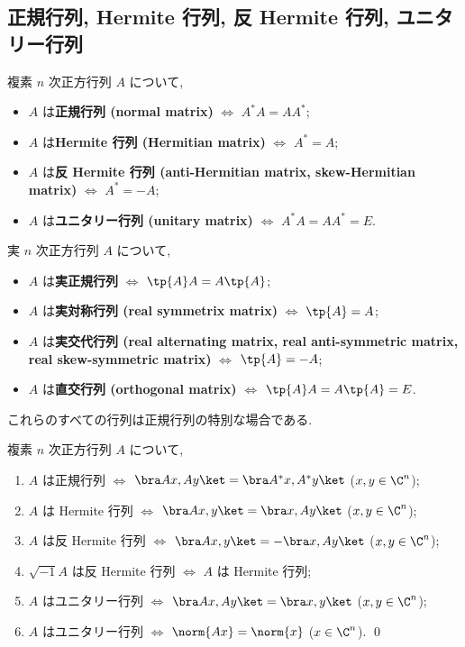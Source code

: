 \documentclass[12pt,twoside]{jarticle}
\begin{document}

\subsection{正規行列, Hermite 行列, 反 Hermite 行列, ユニタリー行列}


複素 $n$ 次正方行列 $A$ について, 
\begin{itemize}
\item $A$ は{\bf 正規行列 (normal matrix)} $\iff$ $A^*A=AA^*$;
\item $A$ は{\bf  Hermite 行列 (Hermitian matrix)} $\iff$ $A^*=A$;
\item $A$ は{\bf 反 Hermite 行列 (anti-Hermitian matrix, skew-Hermitian
    matrix)} $\iff$ $A^* = -A$;
\item $A$ は{\bf ユニタリー行列 (unitary matrix)} $\iff$ 
  $A^*A = AA^* = E$.
\end{itemize}
実 $n$ 次正方行列 $A$ について,
\begin{itemize}
\item $A$ は{\bf 実正規行列} $\iff$ $\tp{A}A=A\tp{A}$; 
\item $A$ は{\bf 実対称行列 (real symmetrix matrix)} $\iff$
  $\tp{A}=A$; 
\item $A$ は{\bf 実交代行列 (real alternating matrix, real anti-symmetric 
    matrix, real skew-symmetric matrix)} $\iff$ $\tp{A}=-A$;
\item $A$ は{\bf 直交行列 (orthogonal matrix)} $\iff$
  $\tp{A}A=A\tp{A}=E$. 
\end{itemize}
これらのすべての行列は正規行列の特別な場合である. 


\begin{question}[12点]
\label{q:normal-matrix-misc}
  複素 $n$ 次正方行列 $A$ について, 
  \begin{enumerate}
  \item $A$ は正規行列 $\iff$ 
    $\bra Ax,Ay\ket = \bra A^*x,A^*y\ket$ \quad ($x,y\in\C^n$);
  \item $A$ は Hermite 行列 $\iff$ 
    $\bra Ax,y\ket = \bra x,Ay\ket$ \quad ($x,y\in\C^n$);
  \item $A$ は反 Hermite 行列 $\iff$ 
    $\bra Ax,y\ket = - \bra x,Ay\ket$ \quad ($x,y\in\C^n$);
  \item $\sqrt{-1}A$ は反 Hermite 行列 $\iff$ $A$ は Hermite 行列;
  \item $A$ はユニタリー行列 $\iff$ 
    $\bra Ax,Ay\ket = \bra x,y\ket$ \quad ($x,y\in\C^n$);
  \item $A$ はユニタリー行列 $\iff$ 
    $\norm{Ax} = \norm{x}$ \quad ($x\in\C^n$).
    \qed
  \end{enumerate}
\end{question}
\end{document}
